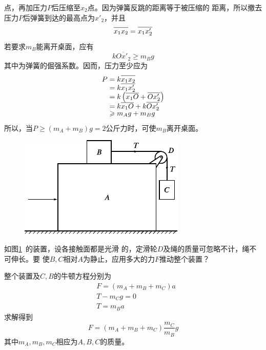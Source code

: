 \noindent 点，再加压力$ P $后压缩至$ x_{2} $点。因为弹簧反跳的距离等于被压缩的
距离，所以撤去压力$ P $后弹簧到达的最高点为$  x'_ { 2 }  $，并且
\begin{equation*}
  \overline{ x _ { 1 } x _ { 2 } \llap{\phantom{'}} } = \overline{ x _ { 1 } x' _ { 2 }}
\end{equation*}
若要求$ m_B $能离开桌面，应有
\begin{equation*}
  k \overline{ O x' _ { 2 } } \geqslant m _ { B } g
\end{equation*}
其中为弹簧的倔强系数。因而，压力至少应为
\begin{align*}
  P & = k \overline{ x _ { 1 } x _ { 2 } \llap{\phantom{'}}}                                      \\[-0.5em]
    & = k \overline{ x _ { 1 } x ' _ { 2 } }                                                      \\[-0.5em]
    & = k \left( \overline{ x _ { 1 } O \llap{\phantom{'}} } + \overline{ O x ' _ { 2 } } \right) \\[-0.5em]
    & = k \overline { x _ { 1 } O \llap{\phantom{'}}} + k \overline { O x '_2}                    \\[-0.5em]
    & \geqslant m _ { A } g + m _ { B } g
\end{align*}
所以，当$  P \geqslant \left( m _ { A } + m _ { B } \right) g = 2 \text{公斤力} $时，可使$ m_{B} $离开桌面。

\begin{figure}
  \centering
  \includegraphics{figure/fig03.12}
  \caption{}
  \label{fig:03.12}
\end{figure}
\example 如图\ref{fig:03.12}~的装置，设各接触面都是光滑
的，定滑轮$ D $及绳的质量可忽略不计，绳不可伸长。要
使$ B , C $相对$ A $为静止，应用多大的力$ F $推动整个装置？

\solution 整个装置及$ C , B $的牛顿方程分别为
\begin{align*}
   & F = \left( m _{A} + m _ { B } + m _ { C } \right) a \\[-0.5em]
   & T - m _ { C } g = 0                                 \\[-0.5em]
   & T = m _ { B } a
\end{align*}
求解得到\vspace{-2em}
\begin{equation*}
  F = \left( m _ { A } + m _ { B } + m _ { C } \right) \frac { m _ { C } } { m _ { B } } g
\end{equation*}
其中$ m_{A} , m_{B} , m_{C} $相应为$ A , B , C $的质量。


